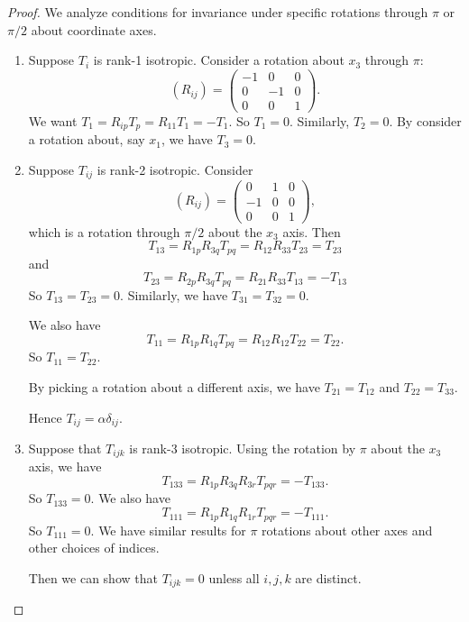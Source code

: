 \documentclass[a4paper]{article}
\begin{document}
\begin{proof}
  We analyze conditions for invariance under specific rotations through $\pi$ or $\pi/2$ about coordinate axes.

  \begin{enumerate}
    \item Suppose $T_i$ is rank-1 isotropic. Consider a rotation about $x_3$ through $\pi$:
      \[
        (R_{ij}) =
        \begin{pmatrix}
          -1 & 0 & 0\\
          0 & -1 & 0\\
          0 & 0 & 1
        \end{pmatrix}.
      \]
      We want $T_1 = R_{ip}T_p = R_{11} T_1 = -T_1$. So $T_1 = 0$. Similarly, $T_2 = 0$. By consider a rotation about, say $x_1$, we have $T_3 = 0$.
    \item Suppose $T_{ij}$ is rank-2 isotropic. Consider
      \[
        (R_{ij}) =
        \begin{pmatrix}
          0 & 1 & 0\\
          -1 & 0 & 0\\
          0 & 0 & 1
        \end{pmatrix},
      \]
      which is a rotation through $\pi/2$ about the $x_3$ axis. Then
      \[
        T_{13} = R_{1p}R_{3q} T_{pq} = R_{12}R_{33}T_{23} = T_{23}
      \]
      and
      \[
        T_{23} = R_{2p}R_{3q} T_{pq} = R_{21}R_{33}T_{13} = -T_{13}
      \]
      So $T_{13} = T_{23} = 0$. Similarly, we have $T_{31} = T_{32} = 0$.

      We also have
      \[
        T_{11} = R_{1p} R_{1q} T_{pq} = R_{12} R_{12}T_{22} = T_{22}.
      \]
      So $T_{11} = T_{22}$.

      By picking a rotation about a different axis, we have $T_{21} = T_{12}$ and $T_{22} = T_{33}$.

      Hence $T_{ij} = \alpha \delta_{ij}$.

    \item Suppose that $T_{ijk}$ is rank-3 isotropic. Using the rotation by $\pi$ about the $x_3$ axis, we have
      \[
        T_{133} = R_{1p}R_{3q}R_{3r}T_{pqr} = -T_{133}.
      \]
      So $T_{133} = 0$. We also have
      \[
        T_{111} = R_{1p}R_{1q}R_{1r}T_{pqr} = -T_{111}.
      \]
      So $T_{111} = 0$. We have similar results for $\pi$ rotations about other axes and other choices of indices.

      Then we can show that $T_{ijk} = 0$ unless all $i, j, k$ are distinct.


\end{enumerate}
\end{proof}
\end{document}
